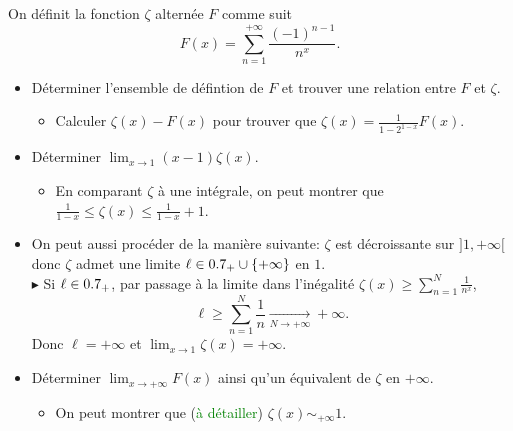On définit la fonction $\zeta$ alternée $F$ comme suit
$$F(x) = \sum_{n=1}^{+ \infty} \frac{(-1)^{n-1}}{n^x}.$$
\begin{itemize}
    \item Déterminer l'ensemble de défintion de $F$ et trouver une relation entre $F$ et $\zeta$.
    \begin{itemize}
        \item Calculer $\zeta(x) - F(x)$ pour trouver que $\zeta(x) = \frac{1}{1-2^{1-x}} F(x)$.
    \end{itemize}
    \item Déterminer $\displaystyle \lim_{x \to 1} (x-1) \zeta(x)$.
    \begin{itemize}
        \item En comparant $\zeta$ à une intégrale, on peut montrer que $\frac{1}{1-x} \leqslant \zeta(x) \leqslant \frac{1}{1-x} + 1$.
    \end{itemize}
    \item On peut aussi procéder de la manière suivante: $\zeta$ est décroissante sur $]1, +\infty[$ donc $\zeta$ admet une limite $\ell \in 0.7_+ \cup \{ + \infty \}$ en $1$.\\
        $\blacktriangleright$ Si $\ell \in 0.7_+$, par passage à la limite dans l'inégalité $\zeta(x) \geqslant \sum\limits_{n=1}^{N} \frac{1}{n^x}$, $$\ell \geqslant \sum\limits_{n=1}^{N} \frac{1}{n} \xrightarrow[N \to + \infty]{} +\infty.$$ 
        Donc $\ell = + \infty$ et $\displaystyle \lim_{x \to 1} \zeta(x) = +\infty$. 
    \item Déterminer $\displaystyle \lim_{x \to +\infty} F(x)$ ainsi qu'un équivalent de $\zeta$ en $+\infty$.
    \begin{itemize}
        \item On peut montrer que (\textcolor{green}{à détailler}) $\zeta(x) \sim_{+ \infty} 1$.
    \end{itemize}
\end{itemize}